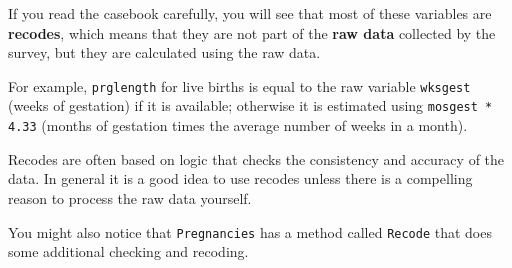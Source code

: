 \documentclass[12pt]{book}
\begin{document}
If you read the casebook carefully, you will see that most of these
variables are {\bf recodes}, which means that they are not part
of the {\bf raw data} collected by the survey, but they are
calculated using the raw data.


For example, {\tt prglength} for live births is equal to the raw
variable {\tt wksgest} (weeks of gestation) if it is available;
otherwise it is estimated using {\tt mosgest * 4.33} (months of
gestation times the average number of weeks in a month).

Recodes are often based on logic that checks the consistency and
accuracy of the data.  In general it is a good idea to use recodes
unless there is a compelling reason to process the raw data
yourself.

You might also notice that {\tt Pregnancies} has a method called
{\tt Recode} that does some additional checking and recoding.
\end{document}
